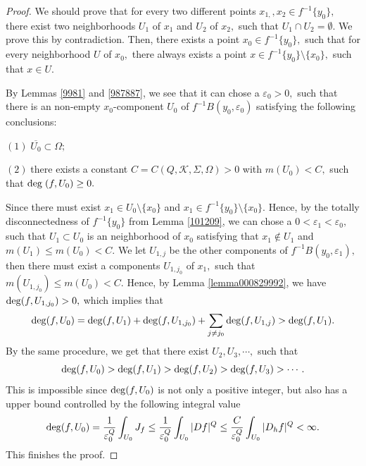\documentclass[11pt,twoside]{article}
\theoremstyle{definition}
\theoremstyle{remark}
\begin{document}
\begin{proof}
We should prove that for every two different points $x_{1,},x_{2}\in f^{-1}\{y_{0}\},$ there exist two neighborhoods $U_{1}$ of $x_{1}$ and $U_{2}$ of $x_{2},$ such that $U_{1}\cap U_{2}=\emptyset.$
We prove this by contradiction. Then, there exists a point $x_{0}\in f^{-1}\{y_{0}\},$ such that for every neighborhood $U$ of $x_{0},$ there always exists a point $x\in f^{-1}\{y_{0}\}\setminus\{x_{0}\},$ such that $x\in U.$

By Lemmas \ref{9981} and \ref{987887}, we see that it can chose a $\varepsilon_{0}>0,$ such that there is an non-empty $x_{0}$-component $U_{0}$ of $f^{-1}B(y_{0},\varepsilon_{0})$  satisfying the following conclusions:
 
 $(1)\;$$\overline{U_{0}}\subset\Omega;$
 
 $(2)\;$there exists a constant $C=C(Q,\mathcal{K},\Sigma,\Omega)>0$ with $m(U_{0})<C,$ such that  ${\rm deg}\;(f,U_{0})\geq0.$

Since there must exist 
$x_{1}\in U_{0}\setminus\{x_{0}\}$ and $ x_{1}\in f^{-1}\{y_{0}\}\setminus\{x_{0}\}.$ Hence, by the totally disconnectedness of $f^{-1}\{y_{0}\}$ from Lemma \ref{101209}, we can chose a $0<\varepsilon_{1}<\varepsilon_{0},$ such that $U_{1}\subset U_{0}$ is an neighborhood of $x_{0}$ satisfying that 
$x_{1}\notin U_{1}$ and $m(U_{1})\leq m(U_{0})< C.$ We let $U_{1,j}$ be the other components of $f^{-1}B(y_{0},\varepsilon_{1}),$ then there must exist a components $U_{1,j_{0}}$ of $x_{1},$ such that 
$m(U_{1,j_{0}})\leq m(U_{0})<C.$ Hence, by Lemma \ref{lemma000829992}, we have ${\rm deg}(f,U_{1,j_{0}})>0,$ which implies that 
$${\rm deg}(f,U_{0})={\rm deg}(f,U_{1})+{\rm deg}(f,U_{1,j_{0}})+\sum_{j\neq j_{0}}{\rm deg}(f,U_{1,j})>{\rm deg}(f,U_{1}).$$ 
By the same procedure, we get that there exist $U_{2},U_{3},\cdots,$ such that 
$${\rm deg}(f,U_{0})>{\rm deg}(f,U_{1})>{\rm deg}(f,U_{2})>{\rm deg}(f,U_{3})>\cdots.$$
This is impossible since  ${\rm deg}(f,U_{0})$  is not only a positive integer, but also has a upper bound controlled by the following integral value
$${\rm deg}(f,U_{0})=\frac{1}{\varepsilon_{0}^{Q}}\int_{U_{0}}J_{f}\leq\frac{1}{\varepsilon_{0}^{Q}}\int_{U_{0}}\vert Df\vert^{Q}\leq\frac{C}{\varepsilon_{0}^{Q}}\int_{U_{0}}\vert D_{h}f\vert^{Q}<\infty.$$ 
This finishes the proof.
\end{proof}
\end{document}
